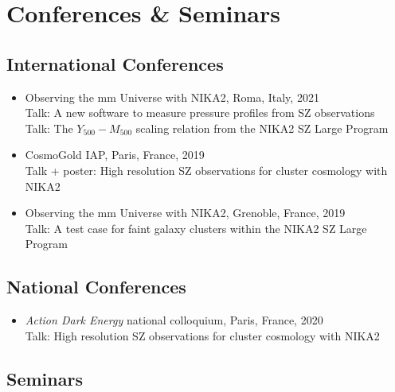 \vspace{-20pt}
\section{Conferences \& Seminars}\label{talks}

\subsection{International Conferences}

\begin{itemize}[leftmargin=20pt]

    \item Observing the mm Universe with NIKA2, Roma, Italy, 2021 \\
        Talk: A new software to measure pressure profiles from SZ observations \\
        Talk: The $Y_{500}-M_{500}$ scaling relation from the NIKA2 SZ Large Program

    \item CosmoGold IAP, Paris, France, 2019 \\
        Talk + poster: High resolution SZ observations for cluster cosmology with NIKA2

    \item Observing the mm Universe with NIKA2, Grenoble, France, 2019 \\
        Talk: A test case for faint galaxy clusters within the NIKA2 SZ Large Program
\vspace{-5pt}
\end{itemize}

\subsection{National Conferences}

\begin{itemize}[leftmargin=20pt]

    \item \textit{Action Dark Energy} national colloquium, Paris, France, 2020 \\
        Talk: High resolution SZ observations for cluster cosmology with NIKA2
\vspace{-5pt}
\end{itemize}

\subsection{Seminars}

